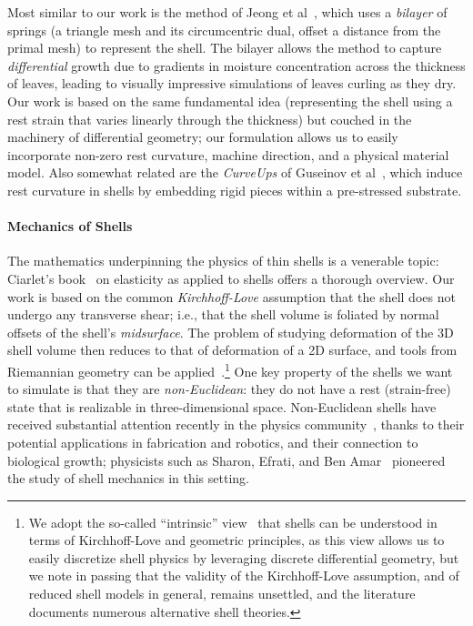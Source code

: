 \documentclass[timestamp,acmtog]{acmart}
\begin{document}
Most similar to our work is the method of Jeong et al~, which uses a \emph{bilayer} of springs (a triangle mesh and its circumcentric dual, offset a distance from the primal mesh) to represent the shell. The bilayer allows the method to capture \emph{differential} growth due to gradients in moisture concentration across the thickness of leaves, leading to visually impressive simulations of leaves curling as they dry. Our work is based on the same fundamental idea (representing the shell using a rest strain that varies linearly through the thickness) but couched in the machinery of differential geometry; our formulation allows us to easily incorporate non-zero rest curvature, machine direction, and a physical material model. Also somewhat related are the \emph{CurveUps} of Guseinov et al~, which induce rest curvature in shells by embedding rigid pieces within a pre-stressed substrate.

\paragraph{Mechanics of Shells}
The mathematics underpinning the physics of thin shells is a venerable topic: Ciarlet's book~ on elasticity as applied to shells offers a thorough overview. Our work is based on the common \emph{Kirchhoff-Love} assumption that the shell does not undergo any transverse shear; i.e., that the shell volume is foliated by normal offsets of the shell's \emph{midsurface}. The problem of studying deformation of the 3D shell volume then reduces to that of deformation of a 2D surface, and tools from Riemannian geometry can be applied~\cite{Simo1989}.\footnote{We adopt the so-called ``intrinsic'' view~\cite{Neff2004} that shells can be understood in terms of Kirchhoff-Love and geometric principles, as this view allows us to easily discretize shell physics by leveraging discrete differential geometry, but we note in passing that the validity of the Kirchhoff-Love assumption, and of reduced shell models in general, remains unsettled, and the literature documents numerous alternative shell theories.} One key property of the shells we want to simulate is that they are \emph{non-Euclidean}: they do not have a rest (strain-free) state that is realizable in three-dimensional space. Non-Euclidean shells have received substantial attention recently in the physics community~\cite{Klein2007,Kim2012}, thanks to their potential applications in fabrication and robotics, and their connection to biological growth; physicists such as Sharon, Efrati, and Ben Amar~\cite{Goriely2005, Dervaux2008,Efrati2009,Sharon2010} pioneered the study of shell mechanics in this setting.
\end{document}
